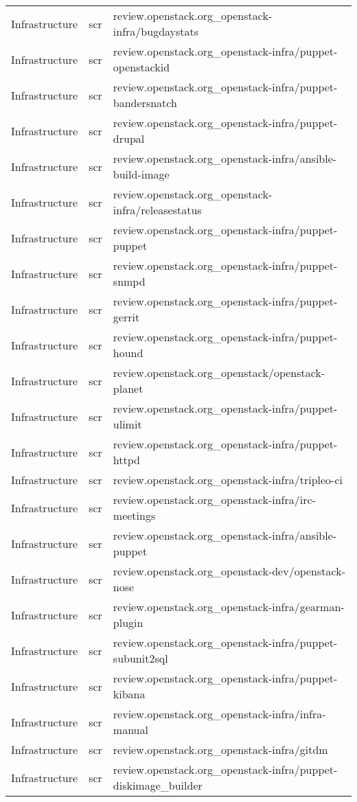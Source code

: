 \begin{center}
\begin{longtable}{|p{4cm}|p{1cm}|p{10cm}|}
Infrastructure&scr&review.openstack.org\_openstack-infra/bugdaystats\\ 
Infrastructure&scr&review.openstack.org\_openstack-infra/puppet-openstackid\\ 
Infrastructure&scr&review.openstack.org\_openstack-infra/puppet-bandersnatch\\ 
Infrastructure&scr&review.openstack.org\_openstack-infra/puppet-drupal\\ 
Infrastructure&scr&review.openstack.org\_openstack-infra/ansible-build-image\\ 
Infrastructure&scr&review.openstack.org\_openstack-infra/releasestatus\\ 
Infrastructure&scr&review.openstack.org\_openstack-infra/puppet-puppet\\ 
Infrastructure&scr&review.openstack.org\_openstack-infra/puppet-snmpd\\ 
Infrastructure&scr&review.openstack.org\_openstack-infra/puppet-gerrit\\ 
Infrastructure&scr&review.openstack.org\_openstack-infra/puppet-hound\\ 
Infrastructure&scr&review.openstack.org\_openstack/openstack-planet\\ 
Infrastructure&scr&review.openstack.org\_openstack-infra/puppet-ulimit\\ 
Infrastructure&scr&review.openstack.org\_openstack-infra/puppet-httpd\\ 
Infrastructure&scr&review.openstack.org\_openstack-infra/tripleo-ci\\ 
Infrastructure&scr&review.openstack.org\_openstack-infra/irc-meetings\\ 
Infrastructure&scr&review.openstack.org\_openstack-infra/ansible-puppet\\ 
Infrastructure&scr&review.openstack.org\_openstack-dev/openstack-nose\\ 
Infrastructure&scr&review.openstack.org\_openstack-infra/gearman-plugin\\ 
Infrastructure&scr&review.openstack.org\_openstack-infra/puppet-subunit2sql\\ 
Infrastructure&scr&review.openstack.org\_openstack-infra/puppet-kibana\\ 
Infrastructure&scr&review.openstack.org\_openstack-infra/infra-manual\\ 
Infrastructure&scr&review.openstack.org\_openstack-infra/gitdm\\ 
Infrastructure&scr&review.openstack.org\_openstack-infra/puppet-diskimage\_builder\\ 

\end{longtable}
\end{center}
